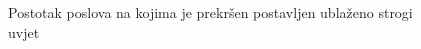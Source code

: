 \documentclass[../zavrsni.tex]{subfiles}
\begin{document}
\begin{figure}[!htb]
    \caption{\label{fig:my-label} Postotak poslova na kojima je prekršen postavljen ublaženo strogi uvjet}
\end{figure}
\end{document}
